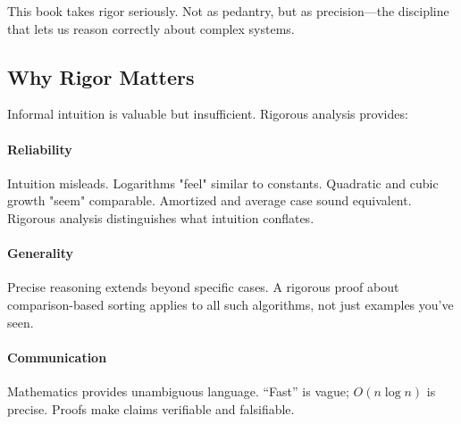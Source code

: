 This book takes rigor seriously. Not as pedantry, but as precision—the discipline that lets us reason correctly about complex systems.

\subsection{Why Rigor Matters}

Informal intuition is valuable but insufficient. Rigorous analysis provides:

\paragraph{Reliability}
Intuition misleads. Logarithms "feel" similar to constants. Quadratic and cubic growth "seem" comparable. Amortized and average case sound equivalent. Rigorous analysis distinguishes what intuition conflates.

\paragraph{Generality}
Precise reasoning extends beyond specific cases. A rigorous proof about comparison-based sorting applies to all such algorithms, not just examples you've seen.

\paragraph{Communication}
Mathematics provides unambiguous language. ``Fast'' is vague; $O(n \log n)$ is precise. Proofs make claims verifiable and falsifiable.